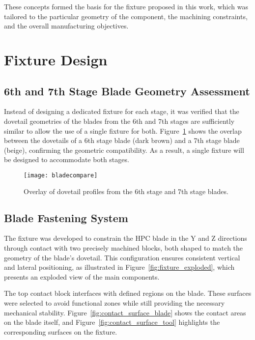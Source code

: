 These concepts formed the basis for the fixture proposed in this work, which was tailored to the particular geometry of the component, the machining constraints, and the overall manufacturing objectives.


\section{Fixture Design}
\label{sec:proto}

\subsection{6th and 7th Stage Blade Geometry Assessment}

Instead of designing a dedicated fixture for each stage, it was verified that the dovetail geometries of the blades from the 6th and 7th stages are sufficiently similar to allow the use of a single fixture for both.
Figure~\ref{fig:bladecompare} shows the overlap between the dovetails of a 6th stage blade (dark brown) and a 7th stage blade (beige), confirming the geometric compatibility.
As a result, a single fixture will be designed to accommodate both stages.

\begin{figure}[H]
    \centering
    \texttt{[image: bladecompare]}
    \caption{Overlay of dovetail profiles from the 6th stage and 7th stage blades.}
    \label{fig:bladecompare}
\end{figure}

\subsection{Blade Fastening System}

The fixture was developed to constrain the HPC blade in the Y and Z directions through contact with two precisely machined blocks, both shaped to match the geometry of the blade’s dovetail. 
This configuration ensures consistent vertical and lateral positioning, as illustrated in Figure~\ref{fig:fixture_exploded}, which presents an exploded view of the main components.

The top contact block interfaces with defined regions on the blade. 
These surfaces were selected to avoid functional zones while still providing the necessary mechanical stability. 
Figure~\ref{fig:contact_surface_blade} shows the contact areas on the blade itself, and Figure~\ref{fig:contact_surface_tool} highlights the corresponding surfaces on the fixture.

